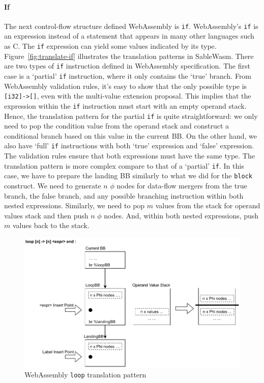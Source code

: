 \paragraph{If}
The next control-flow structure defined WebAssembly is \texttt{if}.
WebAssembly's \texttt{if} is an expression instead of a statement that appears
in many other languages such as C. The \texttt{if} expression can yield some
values indicated by its type. Figure~\ref{fig:translate-if} illustrates the
translation patterns in SableWasm. There are two types of \texttt{if}
instruction defined in WebAssembly specification. The first case is a `partial'
\texttt{if} instruction, where it only contains the `true' branch. From
WebAssembly validation rules, it's easy to show that the only possible type is
\texttt{[i32]->[]}, even with the multi-value extension proposal. This implies
that the expression within the \texttt{if} instruction must start with an empty
operand stack. Hence, the translation pattern for the partial \texttt{if} is
quite straightforward: we only need to pop the condition value from the operand
stack and construct a conditional branch based on this value in the current BB.
On the other hand, we also have `full' \texttt{if} instructions with both `true'
expression and `false' expression. The validation rules ensure that both
expressions must have the same type. The translation pattern is more complex
compare to that of a `partial' \texttt{if}. In this case, we have to prepare the
landing BB similarly to what we did for the \texttt{block} construct. We need to
generate $n$ $\phi$ nodes for data-flow mergers from the true branch, the false
branch, and any possible branching instruction within both nested expressions.
Similarly, we need to pop $m$ values from the stack for operand values stack and
then push $n$ $\phi$ nodes. And, within both nested expressions, push $m$ values
back to the stack.

\begin{figure}
  \centering
  \includegraphics[width=\textwidth]{Images/4.MIR/translate-loop.pdf}
  \caption{WebAssembly \texttt{loop} translation pattern}
  \label{fig:translate-loop}
\end{figure}

